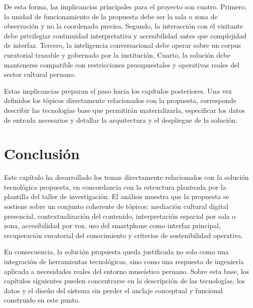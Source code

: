 De esta forma, las implicancias principales para el proyecto son cuatro. Primero, la unidad de funcionamiento de la propuesta debe ser la sala o zona de observaci\'on y no la coordenada precisa. Segundo, la interacci\'on con el visitante debe privilegiar continuidad interpretativa y accesibilidad antes que complejidad de interfaz. Tercero, la inteligencia conversacional debe operar sobre un corpus curatorial trazable y gobernado por la instituci\'on. Cuarto, la soluci\'on debe mantenerse compatible con restricciones presupuestales y operativas reales del sector cultural peruano.

Estas implicancias preparan el paso hacia los cap\'itulos posteriores. Una vez definidos los t\'opicos directamente relacionados con la propuesta, corresponde describir las tecnolog\'ias base que permitir\'an materializarla, especificar los datos de entrada necesarios y detallar la arquitectura y el despliegue de la soluci\'on.

\section{Conclusi\'on}

Este cap\'itulo ha desarrollado los temas directamente relacionados con la soluci\'on tecnol\'ogica propuesta, en concordancia con la estructura planteada por la plantilla del taller de investigaci\'on. El an\'alisis muestra que la propuesta se sostiene sobre un conjunto coherente de t\'opicos: mediaci\'on cultural digital presencial, contextualizaci\'on del contenido, interpretaci\'on espacial por sala o zona, accesibilidad por voz, uso del smartphone como interfaz principal, recuperaci\'on curatorial del conocimiento y criterios de sostenibilidad operativa.

En consecuencia, la soluci\'on propuesta queda justificada no solo como una integraci\'on de herramientas tecnol\'ogicas, sino como una respuesta de ingenier\'ia aplicada a necesidades reales del entorno muse\'istico peruano. Sobre esta base, los cap\'itulos siguientes pueden concentrarse en la descripci\'on de las tecnolog\'ias, los datos y el dise\~no del sistema sin perder el anclaje conceptual y funcional construido en este punto.
